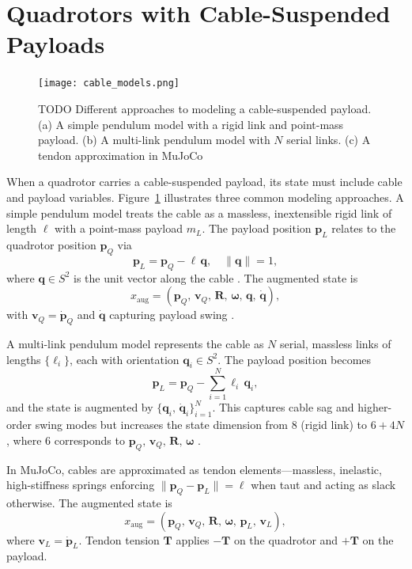 \section{Quadrotors with Cable-Suspended Payloads}
\label{sec:quadrotor_with_payloads}
\begin{figure}

  \centering
  \texttt{[image: cable\_models.png]}
  \caption[Cable modeling approaches]{TODO Different approaches to modeling a cable-suspended payload. (a) A simple pendulum model with a rigid link and point-mass payload. (b) A multi-link pendulum model with \(N\) serial links. (c) A tendon approximation in MuJoCo}
  \label{fig:cable_models}
\end{figure}
When a quadrotor carries a cable-suspended payload, its state must include cable and payload variables. Figure~\ref{fig:cable_models} illustrates three common modeling approaches. A simple pendulum model treats the cable as a massless, inextensible rigid link of length \(\ell\) with a point-mass payload \(m_L\). The payload position \(\mathbf{p}_L\) relates to the quadrotor position \(\mathbf{p}_Q\) via
\begin{equation}
\mathbf{p}_L = \mathbf{p}_Q - \ell\,\mathbf{q}, 
\quad
\|\mathbf{q}\| = 1,
\end{equation}
where \(\mathbf{q}\in S^2\) is the unit vector along the cable \cite{estevez_review_2024}. The augmented state is
\begin{equation}
x_{\mathrm{aug}} = (\mathbf{p}_Q,\,\mathbf{v}_Q,\,\mathbf{R},\,\boldsymbol{\omega},\,\mathbf{q},\,\dot{\mathbf{q}}),
\end{equation}
with \(\mathbf{v}_Q = \dot{\mathbf{p}}_Q\) and \(\dot{\mathbf{q}}\) capturing payload swing \cite{Wahba2024}.

A multi-link pendulum model represents the cable as \(N\) serial, massless links of lengths \(\{\ell_i\}\), each with orientation \(\mathbf{q}_i\in S^2\). The payload position becomes
\begin{equation}
\mathbf{p}_L = \mathbf{p}_Q - \sum_{i=1}^N \ell_i\,\mathbf{q}_i,
\end{equation}
and the state is augmented by \(\{\mathbf{q}_i,\,\dot{\mathbf{q}}_i\}_{i=1}^N\). This captures cable sag and higher-order swing modes but increases the state dimension from 8 (rigid link) to \(6+4N\), where 6 corresponds to \(\mathbf{p}_Q,\,\mathbf{v}_Q,\,\mathbf{R},\,\boldsymbol{\omega}\) \cite{goodarzi_dynamics_2015}.

In MuJoCo, cables are approximated as tendon elements—massless, inelastic, high-stiffness springs enforcing \(\|\mathbf{p}_Q - \mathbf{p}_L\| = \ell\) when taut and acting as slack otherwise. The augmented state is
\begin{equation}
x_{\mathrm{aug}} = (\mathbf{p}_Q,\,\mathbf{v}_Q,\,\mathbf{R},\,\boldsymbol{\omega},\,\mathbf{p}_L,\,\mathbf{v}_L),
\end{equation}
where \(\mathbf{v}_L = \dot{\mathbf{p}}_L\). Tendon tension \(\mathbf{T}\) applies \(-\mathbf{T}\) on the quadrotor and \(+\mathbf{T}\) on the payload.

